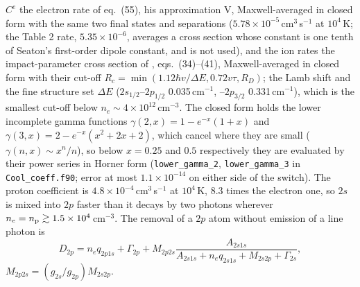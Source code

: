 $C^e$ the electron rate of \citet{Seaton1955} eq.~(55), his approximation V,
Maxwell-averaged in closed form with the same two final states and
separations ($5.78\times10^{-5}$\,cm$^3$\,s$^{-1}$ at $10^4$\,K; the
\citeauthor{Christie2013} Table 2 rate, $5.35\times10^{-6}$, averages a
cross section whose constant is one tenth of Seaton's first-order dipole
constant, and is not used), and
the ion rates
the impact-parameter cross section of \citet{Pengelly1964b}, eqs.~(34)--(41),
Maxwell-averaged in closed form with their cut-off
$R_c = \min(1.12\hbar v/\Delta E, 0.72v\tau, R_D)$; the Lamb shift and the
fine structure set $\Delta E$ ($2s_{1/2}$--$2p_{1/2}$ 0.035\,cm$^{-1}$,
--$2p_{3/2}$ 0.331\,cm$^{-1}$), which is the smallest cut-off below
$n_e\sim4\times10^{12}$\,cm$^{-3}$. The closed form holds the lower
incomplete gamma functions $\gamma(2,x) = 1-e^{-x}(1+x)$ and
$\gamma(3,x) = 2-e^{-x}(x^{2}+2x+2)$, which cancel where they are small
($\gamma(n,x)\sim x^{n}/n$), so below $x = 0.25$ and $0.5$ respectively they
are evaluated by their power series in Horner form (\texttt{lower\_gamma\_2},
\texttt{lower\_gamma\_3} in \texttt{Cool\_coeff.f90}; error at most
$1.1\times10^{-14}$ on either side of the switch). The proton coefficient is
$4.8\times10^{-4}$\,cm$^3$\,s$^{-1}$ at $10^4$\,K, 8.3 times the electron
one, so $2s$ is mixed into $2p$ faster than it decays by two photons
wherever \mbox{$n_e = n_{\rm p}\gtrsim1.5\times10^4$\,cm$^{-3}$}. The removal of a $2p$
atom without emission of a line photon is
\begin{equation}
D_{2p} = n_e q_{2p1s} + \Gamma_{2p}
       + M_{2p2s}\frac{A_{2s1s}}
         {A_{2s1s}+n_eq_{2s1s}+M_{2s2p}+\Gamma_{2s}},
\label{eq:ion:d2p}
\end{equation}
$M_{2p2s} = (g_{2s}/g_{2p})M_{2s2p}$.

